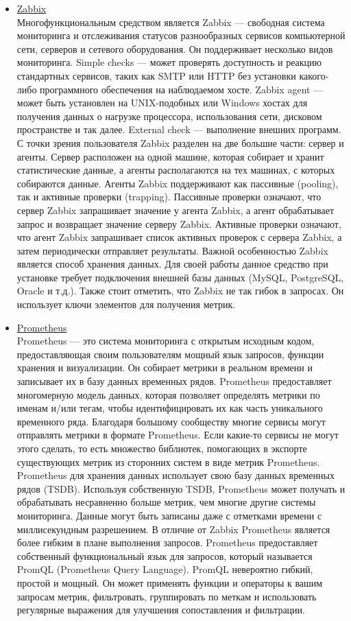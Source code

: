 \begin{itemize}
	\item \underline{Zabbix}\\ Многофункциональным средством является Zabbix — свободная система мониторинга и отслеживания статусов разнообразных сервисов компьютерной сети, серверов и сетевого оборудования. Он поддерживает несколько видов мониторинга. Simple checks — может проверять доступность и реакцию стандартных сервисов, таких как SMTP или HTTP без установки какого-либо программного обеспечения на наблюдаемом хосте. Zabbix agent — может быть установлен на UNIX-подобных или Windows хостах для получения данных о нагрузке процессора, использования сети, дисковом пространстве и так далее. External check — выполнение внешних программ. 
	С точки зрения пользователя Zabbix разделен на две большие части: сервер и агенты. Сервер расположен на одной машине, которая собирает и хранит статистические данные, а агенты располагаются на тех машинах, с которых собираются данные. Агенты Zabbix поддерживают как пассивные (pooling), так и активные проверки (trapping). Пассивные проверки означают, что сервер Zabbix запрашивает значение у агента Zabbix, а агент обрабатывает запрос и возвращает значение серверу Zabbix. Активные проверки означают, что агент Zabbix запрашивает список активных проверок с сервера Zabbix, а затем периодически отправляет результаты.
	Важной особенностью Zabbix является способ хранения данных. Для своей работы данное средство при установке требует подключения внешней базы данных (MySQL, PostgreSQL, Oracle и т.д.).
	Также стоит отметить, что Zabbix не так гибок в запросах. Он использует ключи элементов для получения метрик.
	\item \underline{Prometheus}\\ Prometheus — это система мониторинга с открытым исходным кодом, предоставляющая своим пользователям мощный язык запросов, функции хранения и визуализации. Он собирает метрики в реальном времени и записывает их в базу данных временных рядов. Prometheus предоставляет многомерную модель данных, которая позволяет определять метрики по именам и/или тегам, чтобы идентифицировать их как часть уникального временного ряда. Благодаря большому сообществу многие сервисы могут отправлять метрики в формате Prometheus. Если какие-то сервисы не могут этого сделать, то есть множество библиотек, помогающих в экспорте существующих метрик из сторонних систем в виде метрик Prometheus. 
	Prometheus для хранения данных использует свою базу данных временных рядов (TSDB). Используя собственную TSDB, Prometheus может получать и обрабатывать несравненно больше метрик, чем многие другие системы мониторинга. Данные могут быть записаны даже с отметками времени с миллисекундным разрешением. 
	В отличие от Zabbix Prometheus является более гибким в плане выполнения запросов. Prometheus предоставляет собственный функциональный язык для запросов, который называется PromQL (Prometheus Query Language). PromQL невероятно гибкий, простой и мощный. Он может применять функции и операторы к вашим запросам метрик, фильтровать, группировать по меткам и использовать регулярные выражения для улучшения сопоставления и фильтрации.
\end{itemize} 

